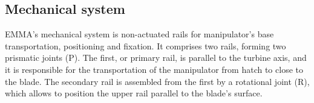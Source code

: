 % 


 

\subsection{Mechanical system}

EMMA's mechanical system is non-actuated rails for
manipulator's base transportation, positioning and fixation. It comprises two
rails, forming two prismatic joints (P). The first, or primary rail, is parallel to the turbine axis, and it is
responsible for the transportation of the manipulator from hatch to close
to the blade. The secondary rail is assembled from the first by a
rotational joint (R), which allows to position the upper rail parallel to the blade's surface.

